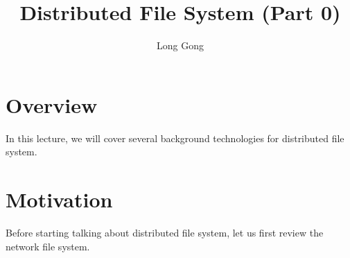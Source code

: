 \documentclass[11pt]{lecture}
\begin{document}
\title{Distributed File System (Part 0)}%
\author{Long Gong}
\maketitle

\section{Overview}\label{sec: overview}

In this lecture, we will cover several background technologies for distributed file system.



\section{Motivation}\label{sec: mot}

Before starting talking about distributed file system, 
let us first review the network file system. 
\end{document}
